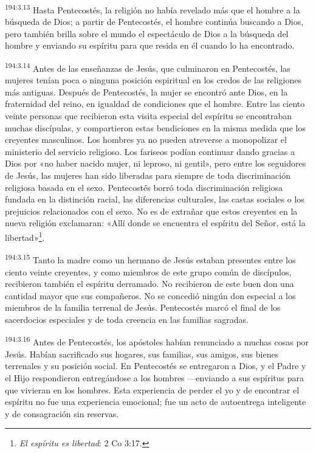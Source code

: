 \par 
\textsuperscript{194:3.13} Hasta Pentecostés, la religión no había revelado más que el hombre a la búsqueda de Dios; a partir de Pentecostés, el hombre continúa buscando a Dios, pero también brilla sobre el mundo el espectáculo de Dios a la búsqueda del hombre y enviando su espíritu para que resida en él cuando lo ha encontrado.

\par 
\textsuperscript{194:3.14} Antes de las enseñanzas de Jesús, que culminaron en Pentecostés, las mujeres tenían poca o ninguna posición espiritual en los credos de las religiones más antiguas. Después de Pentecostés, la mujer se encontró ante Dios, en la fraternidad del reino, en igualdad de condiciones que el hombre. Entre las ciento veinte personas que recibieron esta visita especial del espíritu se encontraban muchas discípulas, y compartieron estas bendiciones en la misma medida que los creyentes masculinos. Los hombres ya no pueden atreverse a monopolizar el ministerio del servicio religioso. Los fariseos podían continuar dando gracias a Dios por «no haber nacido mujer, ni leproso, ni gentil», pero entre los seguidores de Jesús, las mujeres han sido liberadas para siempre de toda discriminación religiosa basada en el sexo. Pentecostés borró toda discriminación religiosa fundada en la distinción racial, las diferencias culturales, las castas sociales o los prejuicios relacionados con el sexo. No es de extrañar que estos creyentes en la nueva religión exclamaran: «Allí donde se encuentra el espíritu del Señor, está la libertad»\footnote{\textit{El espíritu es libertad}: 2 Co 3:17.}.

\par 
\textsuperscript{194:3.15} Tanto la madre como un hermano de Jesús estaban presentes entre los ciento veinte creyentes, y como miembros de este grupo común de discípulos, recibieron también el espíritu derramado. No recibieron de este buen don una cantidad mayor que sus compañeros. No se concedió ningún don especial a los miembros de la familia terrenal de Jesús. Pentecostés marcó el final de los sacerdocios especiales y de toda creencia en las familias sagradas.

\par 
\textsuperscript{194:3.16} Antes de Pentecostés, los apóstoles habían renunciado a muchas cosas por Jesús. Habían sacrificado sus hogares, sus familias, sus amigos, sus bienes terrenales y su posición social. En Pentecostés se entregaron a Dios, y el Padre y el Hijo respondieron entregándose a los hombres ---enviando a sus espíritus para que vivieran en los hombres. Esta experiencia de perder el yo y de encontrar el espíritu no fue una experiencia emocional; fue un acto de autoentrega inteligente y de consagración sin reservas.


